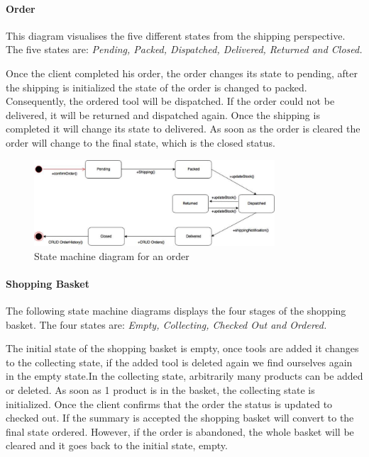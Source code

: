 \hypertarget{order}{%
\paragraph{Order}\label{order}}

This diagram visualises the five different states from the shipping
perspective. The five states are:
\textit{Pending, Packed, Dispatched, Delivered, Returned and Closed.}

Once the client completed his order, the order changes its state to
pending, after the shipping is initialized the state of the order is
changed to packed. Consequently, the ordered tool will be dispatched. If
the order could not be delivered, it will be returned and dispatched
again. Once the shipping is completed it will change its state to
delivered. As soon as the order is cleared the order will change to the
final state, which is the closed status.

\begin{figure}[H]
      \centering
      \includegraphics[trim = 0 0 0 0, clip, width=0.8\textwidth]{TempImg/OrderSM.png}
      \caption{State machine diagram for an order}
\end{figure}

\hypertarget{shopping-basket}{%
\paragraph{Shopping Basket}\label{shopping-basket}}

The following state machine diagrams displays the four stages of the
shopping basket. The four states are:
\textit{Empty, Collecting, Checked Out and Ordered.}

The initial state of the shopping basket is empty, once tools are added
it changes to the collecting state, if the added tool is deleted again
we find ourselves again in the empty state.In the collecting state,
arbitrarily many products can be added or deleted. As soon as 1 product
is in the basket, the collecting state is initialized. Once the client
confirms that the order the status is updated to checked out. If the
summary is accepted the shopping basket will convert to the final state
ordered. However, if the order is abandoned, the whole basket will be
cleared and it goes back to the initial state, empty.

